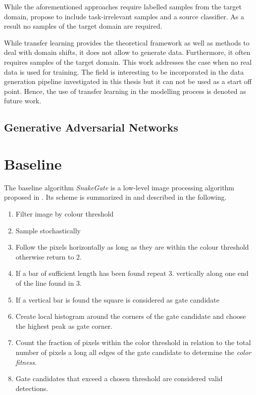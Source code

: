 While the aforementioned approaches require labelled samples from the target domain, \citeauthor{Peng2017} \cite{Peng2017} propose to include task-irrelevant samples and a source classifier. As a result no samples of the target domain are required.

While transfer learning provides the theoretical framework as well as methods to deal with domain shifts, it does not allow to generate data. Furthermore, it often requires samples of the target domain. This work addresses the case when no real data is used for training. The field is interesting to be incorporated in the data generation pipeline investigated in this thesis but it can not be used as a start off point. Hence, the use of transfer learning in the modelling process is denoted as future work.

\subsection{Generative Adversarial Networks}

\cite{Inoue} 





\section{Baseline}

The baseline algorithm \textit{SnakeGate} is a low-level image processing algorithm proposed in . Its scheme is summarized in and described in the following.

\begin{enumerate}
	\item Filter image by colour threshold
	\item Sample stochastically 
	\item Follow the pixels horizontally as long as they are within the colour threshold otherwise return to 2.
	\item If a bar of sufficient length has been found repeat 3. vertically along one end of the line found in 3.
	\item If a vertical bar is found the square is considered as gate candidate
	\item Create local histogram around the corners of the gate candidate and choose the highest peak as gate corner.
	\item Count the fraction of pixels within the color threshold  in relation to the total number of pixels a long all edges of the gate candidate to determine the \textit{color fitness}.
	\item Gate candidates that exceed a chosen threshold are considered valid detections.
\end{enumerate}

